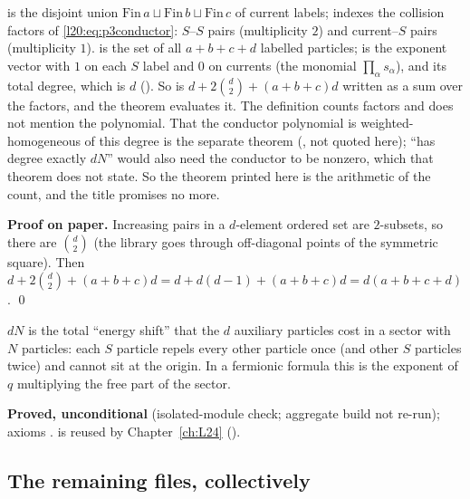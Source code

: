 \begin{dictionary}
 is the disjoint union $\mathrm{Fin}\,a\sqcup\mathrm{Fin}\,b\sqcup\mathrm{Fin}\,c$ of current labels;
 indexes the collision factors of \eqref{l20:eq:p3conductor}: $S$--$S$ pairs (multiplicity $2$) and
current--$S$ pairs (multiplicity $1$).  is the set of all $a+b+c+d$ labelled
particles;  is the exponent vector with $1$ on each $S$ label and $0$ on currents (the
monomial $\prod_\alpha s_\alpha$), and  its total degree, which is $d$
(). So  is $d+2\binom d2+(a+b+c)d$ written as a sum over the factors,
and the theorem evaluates it. The definition counts factors and does not mention the polynomial. That the conductor polynomial  is
weighted-homogeneous of this degree is the separate theorem 
(, not quoted here); ``has degree exactly $dN$'' would also need the conductor to be
nonzero, which that theorem does not state. So the theorem printed here is the arithmetic of the count, and the title promises no more.
\end{dictionary}

\textbf{Proof on paper.} Increasing pairs in a $d$-element ordered set are $2$-subsets, so there are $\binom d2$ (the library goes
through off-diagonal points of the symmetric square). Then $d+2\binom d2+(a+b+c)d=d+d(d-1)+(a+b+c)d=d(a+b+c+d)$. \qed

\begin{physics}
$dN$ is the total ``energy shift'' that the $d$ auxiliary particles cost in a sector with $N$ particles: each $S$ particle repels every
other particle once (and other $S$ particles twice) and cannot sit at the origin. In a fermionic formula this is the exponent of $q$
multiplying the free part of the sector.
\end{physics}

\begin{status}
\textbf{Proved, unconditional} (isolated-module check; aggregate build not re-run); axioms .  is reused by
Chapter~\ref{ch:L24} ().
\end{status}

\subsection{The remaining files, collectively}

